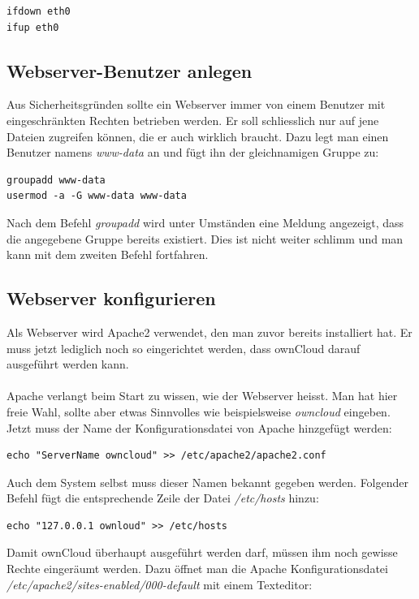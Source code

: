 \begin{lstlisting}
ifdown eth0
ifup eth0
\end{lstlisting}

\subsection{Webserver-Benutzer anlegen}
Aus Sicherheitsgründen sollte ein Webserver immer von einem Benutzer mit eingeschränkten Rechten betrieben werden. Er soll schliesslich nur auf jene Dateien zugreifen können, die er auch wirklich braucht. Dazu legt man einen Benutzer namens \textit{www-data} an und fügt ihn der gleichnamigen Gruppe zu:

\begin{lstlisting}
groupadd www-data
usermod -a -G www-data www-data
\end{lstlisting}

Nach dem Befehl \textit{groupadd} wird unter Umständen eine Meldung angezeigt, dass die angegebene Gruppe bereits existiert. Dies ist nicht weiter schlimm und man kann mit dem zweiten Befehl fortfahren.

\subsection{Webserver konfigurieren}
Als Webserver wird Apache2 verwendet, den man zuvor bereits installiert hat. Er muss jetzt lediglich noch so eingerichtet werden, dass ownCloud darauf ausgeführt werden kann.
\\
\\
Apache verlangt beim Start zu wissen, wie der Webserver heisst. Man hat hier freie Wahl, sollte aber etwas Sinnvolles wie beispielsweise \textit{owncloud} eingeben.
\\
Jetzt muss der Name der Konfigurationsdatei von Apache hinzgefügt werden:

\begin{lstlisting}
echo "ServerName owncloud" >> /etc/apache2/apache2.conf
\end{lstlisting}

Auch dem System selbst muss dieser Namen bekannt gegeben werden. Folgender Befehl fügt die entsprechende Zeile der Datei \textit{/etc/hosts} hinzu:

\begin{lstlisting}
echo "127.0.0.1 ownloud" >> /etc/hosts
\end{lstlisting}

Damit ownCloud überhaupt ausgeführt werden darf, müssen ihm noch gewisse Rechte eingeräumt werden. Dazu öffnet man die Apache Konfigurationsdatei \textit{/etc/apache2/sites-enabled/000-default} mit einem Texteditor:

